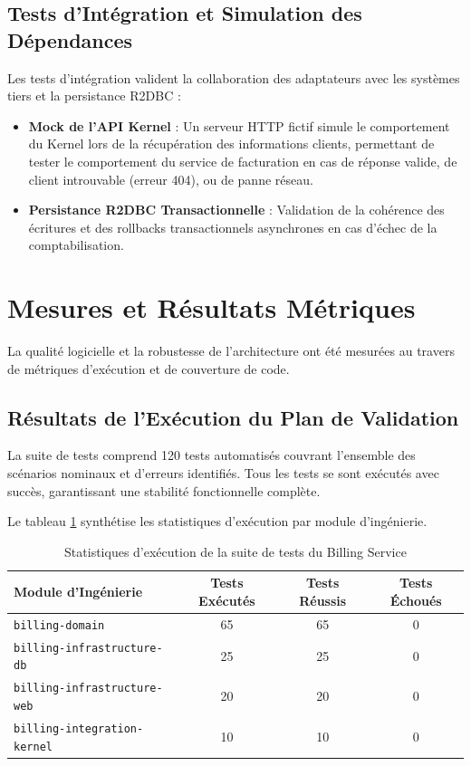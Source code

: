 \subsection{Tests d'Intégration et Simulation des Dépendances}
Les tests d'intégration valident la collaboration des adaptateurs avec les systèmes tiers et la persistance R2DBC :
\begin{itemize}
    \item \textbf{Mock de l'API Kernel} : Un serveur HTTP fictif simule le comportement du Kernel lors de la récupération des informations clients, permettant de tester le comportement du service de facturation en cas de réponse valide, de client introuvable (erreur 404), ou de panne réseau.
    \item \textbf{Persistance R2DBC Transactionnelle} : Validation de la cohérence des écritures et des rollbacks transactionnels asynchrones en cas d'échec de la comptabilisation.
\end{itemize}

\section{Mesures et Résultats Métriques}
La qualité logicielle et la robustesse de l'architecture ont été mesurées au travers de métriques d'exécution et de couverture de code.

\subsection{Résultats de l'Exécution du Plan de Validation}
La suite de tests comprend 120 tests automatisés couvrant l'ensemble des scénarios nominaux et d'erreurs identifiés. Tous les tests se sont exécutés avec succès, garantissant une stabilité fonctionnelle complète.

Le tableau \ref{tab:test_execution} synthétise les statistiques d'exécution par module d'ingénierie.

\begin{table}[htbp]
\centering
\caption{Statistiques d'exécution de la suite de tests du Billing Service}
\label{tab:test_execution}
\begin{tabular}{lccc}
\toprule
\textbf{Module d'Ingénierie} & \textbf{Tests Exécutés} & \textbf{Tests Réussis} & \textbf{Tests Échoués} \\
\midrule
\texttt{billing-domain} & 65 & 65 & 0 \\
\texttt{billing-infrastructure-db} & 25 & 25 & 0 \\
\texttt{billing-infrastructure-web} & 20 & 20 & 0 \\
\texttt{billing-integration-kernel} & 10 & 10 & 0 \\
\bottomrule
\end{tabular}
\end{table}


